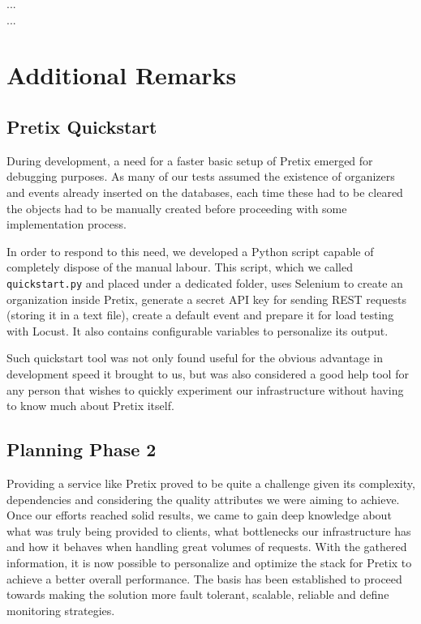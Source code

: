 \documentclass[12pt]{article}
\begin{document}
... \\

...

\newpage
\section{Additional Remarks} \label{remarks} %

\subsection{Pretix Quickstart} \label{remarks.quickstart} %


During development, a need for a faster basic setup of Pretix emerged for debugging purposes.
As many of our tests assumed the existence of organizers and events already inserted on the databases, each time these had to be cleared the objects had to be 
manually created before proceeding with some implementation process.

In order to respond to this need, we developed a Python script capable of completely dispose of the manual labour.
This script, which we called \texttt{quickstart.py} and placed under a dedicated folder, uses Selenium \cite{selenium} to create an organization inside Pretix, 
generate a secret API key for sending REST requests (storing it in a text file), create a default event and prepare it for load testing with Locust.
It also contains configurable variables to personalize its output.

Such quickstart tool was not only found useful for the obvious advantage in development speed it brought to us, but was also considered a good help tool for any 
person that wishes to quickly experiment our infrastructure without having to know much about Pretix itself.

\subsection{Planning Phase 2} \label{remarks.planning} %


Providing a service like Pretix proved to be quite a challenge given its complexity, dependencies and considering the quality attributes we were aiming to achieve.
Once our efforts reached solid results, we came to gain deep knowledge about what was truly being provided to clients, what bottlenecks our infrastructure has 
and how it behaves when handling great volumes of requests.
With the gathered information, it is now possible to personalize and optimize the stack for Pretix to achieve a better overall performance.
The basis has been established to proceed towards making the solution more fault tolerant, scalable, reliable and define monitoring strategies.
\end{document}
